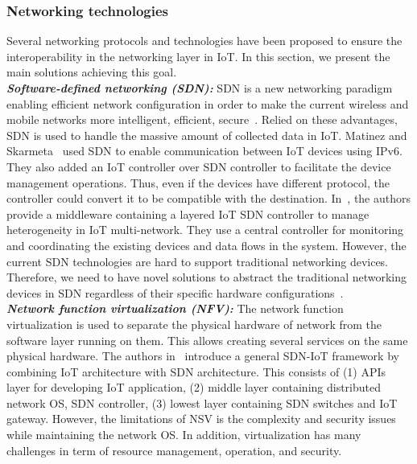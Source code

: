 \subsubsection{Networking technologies}
Several networking protocols and technologies have been proposed to ensure the interoperability in the networking layer in IoT. In this section, we present the main solutions achieving this goal.\\

\textbf{\textit{Software-defined networking (SDN): }} SDN is a new networking paradigm enabling efficient network configuration in order to make the current wireless and mobile networks more intelligent, efficient, secure~\cite{kreutz2015software}. Relied on these advantages, SDN is used to handle the massive amount of collected data in IoT. Matinez and Skarmeta~\cite{bizanis2016sdn} used SDN to enable communication between IoT devices using IPv6. They also added an IoT controller over SDN controller to facilitate the device management operations. Thus, even if the devices have different protocol, the controller could convert it to be compatible with the destination. In~\cite{qin2014software}, the authors provide a middleware containing a layered IoT SDN controller to manage heterogeneity in IoT multi-network. They use a central controller for monitoring and coordinating the existing devices and data flows in the system. However, the current SDN technologies are hard to support traditional networking devices. Therefore, we need to have novel solutions to abstract the traditional networking devices in SDN regardless of their specific hardware configurations~\cite{8017556}.\\

\textbf{\textit{Network function virtualization (NFV): }} The network function virtualization is used to separate the physical hardware of network from the software layer running on them. This allows creating several services on the same physical hardware. The authors in~\cite{li2015general} introduce a general SDN-IoT framework by combining IoT architecture with SDN architecture. This consists of (1) APIs layer for developing IoT application, (2) middle layer containing distributed network OS, SDN controller, (3) lowest layer containing SDN switches and IoT gateway. However, the limitations of NSV is the complexity and security issues while maintaining the network OS. In addition, virtualization has many challenges in term of resource management, operation, and security.\\

